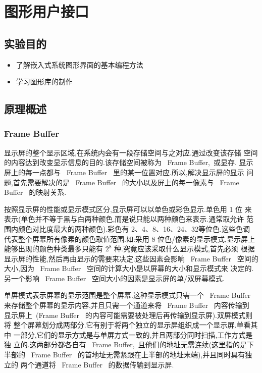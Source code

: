 \chapter{图形用户接口}

\section{实验目的}
\begin{itemize}\itemsep=-3pt
  \item 了解嵌入式系统图形界面的基本编程方法
  \item 学习图形库的制作
\end{itemize}

\section{原理概述}
\subsection{Frame Buffer}
	显示屏的整个显示区域,在系统内会有一段存储空间与之对应.通过改变该存储
空间的内容达到改变显示信息的目的.该存储空间被称为 ~Frame Buffer,~或显存.
显示屏上的每一点都与 ~Frame Buffer~ 里的某一位置对应.所以,解决显示屏的显示
问题,首先需要解决的是 ~Frame Buffer~ 的大小以及屏上的每一像素与 ~Frame
Buffer~ 的映射关系.

	按照显示屏的性能或显示模式区分,显示屏可以以单色或彩色显示.单色用 1 位
来表示(单色并不等于黑与白两种颜色,而是说只能以两种颜色来表示.通常取允许
范围内颜色对比度最大的两种颜色).彩色有 2、4、8、16、24、32等位色.这些色调
代表整个屏幕所有像素的颜色取值范围.如:采用 8 位色/像素的显示模式,显示屏上
能够出现的颜色种类最多只能有 $2^8$ 种.究竟应该采取什么显示模式,首先必须
根据显示屏的性能,然后再由显示的需要来决定.这些因素会影响 ~Frame Buffer~
空间的大小,因为 ~Frame Buffer~ 空间的计算大小是以屏幕的大小和显示模式来
决定的.另一个影响 ~Frame Buffer~ 空间大小的因素是显示屏的单/双屏幕模式.

	单屏模式表示屏幕的显示范围是整个屏幕.这种显示模式只需一个 ~Frame Buffer~
来存储整个屏幕的显示内容,并且只需一个通道来将 ~Frame Buffer~ 内容传输到
显示屏上~(Frame Buffer~ 的内容可能需要被处理后再传输到显示屏).双屏模式则将
整个屏幕划分成两部分.它有别于将两个独立的显示屏组织成一个显示屏.单看其中
一部分,它们的显示方式是与单屏方式一致的,并且两部分同时扫描,工作方式是独
立的.这两部分都各自有 ~Frame Buffer,~且他们的地址无需连续(这里指的是下
半部的 ~Frame Buffer~ 的首地址无需紧跟在上半部的地址末端),并且同时具有独立的
两个通道将 ~Frame Buffer~ 的数据传输到显示屏.

